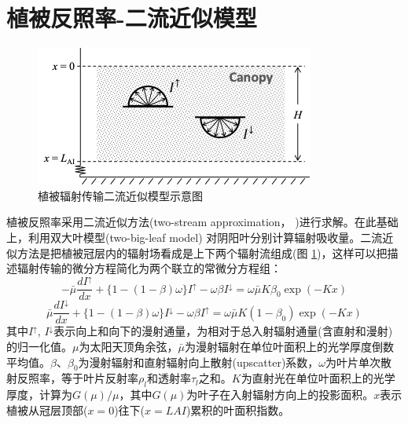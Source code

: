 \section{植被反照率-二流近似模型}\label{植被反照率二流近似模型}
{
\begin{figure}[]
\centering
\includegraphics{Figures/辐射过程及辐射通量计算/二流近似模型示意图.png}
\caption{植被辐射传输二流近似模型示意图}
\label{fig:二流近似模型示意图}
\end{figure}
}
植被反照率采用二流近似方法(two-stream approximation，\citet{dickinson1983land,sellers1985canopy} )进行求解。在此基础上，利用双大叶模型(two-big-leaf model) \citep{dai2004two} 对阴阳叶分别计算辐射吸收量。二流近似方法是把植被冠层内的辐射场看成是上下两个辐射流组成(图 \ref{fig:二流近似模型示意图})，这样可以把描述辐射传输的微分方程简化为两个联立的常微分方程组：
\begin{equation}\label{di_dx1}
-\bar{\mu} \frac{d I^{\uparrow}}{d x}+\{1-(1-\beta) \omega\} I^{\uparrow}-\omega \beta I^{\downarrow}=\omega \bar{\mu} K \beta_{0} \exp (-K x)
\end{equation}
\begin{equation}\label{di_dx2}
\bar{\mu} \frac{d I^{\downarrow}}{d x}+\{1-(1-\beta) \omega\} I^{\downarrow}-\omega \beta I^{\uparrow}=\omega \bar{\mu} K\left(1-\beta_{0}\right) \exp (-K x)
\end{equation}
其中$I^{\uparrow}$, $I^{\downarrow}$表示向上和向下的漫射通量，为相对于总入射辐射通量(含直射和漫射)的归一化值。$\mu$为太阳天顶角余弦，$\bar{\mu}$为漫射辐射在单位叶面积上的光学厚度倒数平均值。$\beta$、$\beta_{0}$为漫射辐射和直射辐射向上散射(upscatter)系数，$\omega$为叶片单次散射反照率，等于叶片反射率$\rho_{l}$和透射率$\tau_{l}$之和。$K$为直射光在单位叶面积上的光学厚度，计算为$G(\mu) / \mu$，其中$G(\mu)$为叶子在入射辐射方向上的投影面积。$x$表示植被从冠层顶部($x=0$)往下($x=LAI$)累积的叶面积指数。

